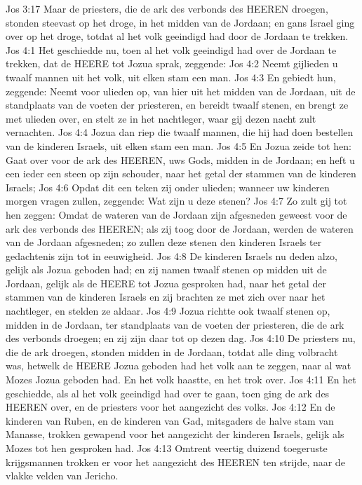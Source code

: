 Jos 3:17  Maar de priesters, die de ark des verbonds des HEEREN droegen, stonden steevast op het droge, in het midden van de Jordaan; en gans Israel ging over op het droge, totdat al het volk geeindigd had door de Jordaan te trekken.
Jos 4:1  Het geschiedde nu, toen al het volk geeindigd had over de Jordaan te trekken, dat de HEERE tot Jozua sprak, zeggende:
Jos 4:2  Neemt gijlieden u twaalf mannen uit het volk, uit elken stam een man.
Jos 4:3  En gebiedt hun, zeggende: Neemt voor ulieden op, van hier uit het midden van de Jordaan, uit de standplaats van de voeten der priesteren, en bereidt twaalf stenen, en brengt ze met ulieden over, en stelt ze in het nachtleger, waar gij dezen nacht zult vernachten.
Jos 4:4  Jozua dan riep die twaalf mannen, die hij had doen bestellen van de kinderen Israels, uit elken stam een man.
Jos 4:5  En Jozua zeide tot hen: Gaat over voor de ark des HEEREN, uws Gods, midden in de Jordaan; en heft u een ieder een steen op zijn schouder, naar het getal der stammen van de kinderen Israels;
Jos 4:6  Opdat dit een teken zij onder ulieden; wanneer uw kinderen morgen vragen zullen, zeggende: Wat zijn u deze stenen?
Jos 4:7  Zo zult gij tot hen zeggen: Omdat de wateren van de Jordaan zijn afgesneden geweest voor de ark des verbonds des HEEREN; als zij toog door de Jordaan, werden de wateren van de Jordaan afgesneden; zo zullen deze stenen den kinderen Israels ter gedachtenis zijn tot in eeuwigheid.
Jos 4:8  De kinderen Israels nu deden alzo, gelijk als Jozua geboden had; en zij namen twaalf stenen op midden uit de Jordaan, gelijk als de HEERE tot Jozua gesproken had, naar het getal der stammen van de kinderen Israels en zij brachten ze met zich over naar het nachtleger, en stelden ze aldaar.
Jos 4:9  Jozua richtte ook twaalf stenen op, midden in de Jordaan, ter standplaats van de voeten der priesteren, die de ark des verbonds droegen; en zij zijn daar tot op dezen dag.
Jos 4:10  De priesters nu, die de ark droegen, stonden midden in de Jordaan, totdat alle ding volbracht was, hetwelk de HEERE Jozua geboden had het volk aan te zeggen, naar al wat Mozes Jozua geboden had. En het volk haastte, en het trok over.
Jos 4:11  En het geschiedde, als al het volk geeindigd had over te gaan, toen ging de ark des HEEREN over, en de priesters voor het aangezicht des volks.
Jos 4:12  En de kinderen van Ruben, en de kinderen van Gad, mitsgaders de halve stam van Manasse, trokken gewapend voor het aangezicht der kinderen Israels, gelijk als Mozes tot hen gesproken had.
Jos 4:13  Omtrent veertig duizend toegeruste krijgsmannen trokken er voor het aangezicht des HEEREN ten strijde, naar de vlakke velden van Jericho.
